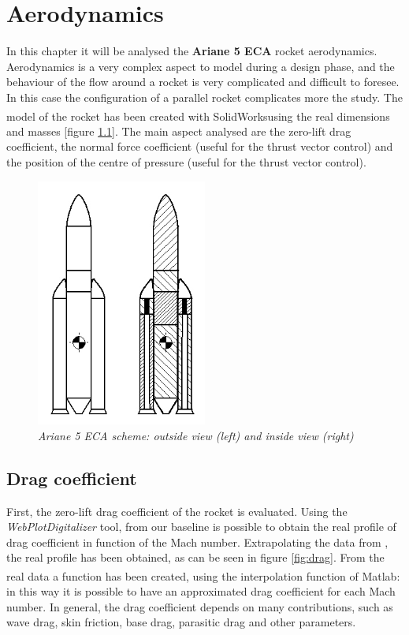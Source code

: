 \documentclass[12pt,fleqn,openany]{book} %
\begin{document}
\chapter{Aerodynamics}
In this chapter it will be analysed the \textbf{Ariane 5 ECA} rocket aerodynamics. Aerodynamics is a very complex aspect to model during a design phase, and the behaviour of the flow around a rocket is very complicated and difficult to foresee. In this case the configuration of a parallel rocket complicates more the study. The model of the rocket has been created with SolidWorks\textsuperscript\textregistered using the real dimensions and masses [figure \hypertarget{fig:A5s}{\ref{fig:A5s}}]. The main aspect analysed are the zero-lift drag coefficient, the normal force coefficient (useful for the thrust vector control) and the position of the centre of pressure (useful for the thrust vector control). 
\begin{figure}[h]
 \centering
 \includegraphics[width=0.5\textwidth]{A5scheme}
 \caption{\emph{Ariane 5 ECA scheme: outside view (left) and inside view (right)}}
 \label{fig:A5s}
\end{figure}
\section{Drag coefficient}
First, the zero-lift drag coefficient of the rocket is evaluated. Using the \textit{WebPlotDigitalizer} tool, from our baseline is possible to obtain the real profile of drag coefficient in function of the Mach number. Extrapolating the data from \cite{bib:7}, the real profile has been obtained, as can be seen in figure \hypertarget{fig:drag}{\ref{fig:drag}}. From the real data a function has been created, using the interpolation function of Matlab\textsuperscript\textregistered: in this way it is possible to have an approximated drag coefficient for each Mach number. In general, the drag coefficient depends on many contributions, such as wave drag, skin friction, base drag, parasitic drag and other parameters.
\end{document}

